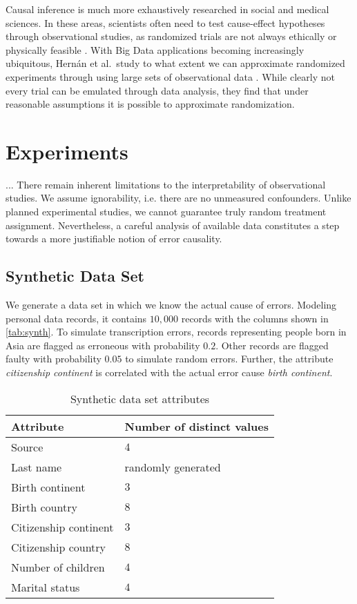 \documentclass[acmsmall, nonacm, screen]{acmart} %
\begin{document}
Causal inference is much more exhaustively researched in social and medical sciences. In these areas, scientists often need to test cause-effect hypotheses through observational studies, as randomized trials are not always ethically or physically feasible \cite{Rosenbaum02}.
With Big Data applications becoming increasingly ubiquitous, Hern\'{a}n et al.\ study to what extent we can approximate randomized experiments through using large sets of observational data \cite{Robins16}.
While clearly not every trial can be emulated through data analysis, they find that under reasonable assumptions it is possible to approximate randomization.\\


\section{Experiments}
...
There remain inherent limitations to the interpretability of observational studies. We assume ignorability, i.e. there are no unmeasured confounders. 
Unlike planned experimental studies, we cannot guarantee truly random treatment assignment. Nevertheless, a careful analysis of available data constitutes a step towards a more justifiable notion of error causality.\\

\subsection{Synthetic Data Set}
We generate a data set in which we know the actual cause of errors. Modeling personal data records, it contains $10,000$ records with the columns shown in \autoref{tab:synth}. 
To simulate transcription errors, records representing people born in Asia are flagged as erroneous with probability $0.2$. Other records are flagged faulty with probability $0.05$ to simulate random errors.
Further, the attribute \textit{citizenship continent} is correlated with the actual error cause \textit{birth continent}.
\begin{table}[htbp]
\begin{center}
\begin{tabular}{ll}
\toprule 
Attribute & Number of distinct values \\ 
\midrule 
Source & $4$ \\ 
Last name  & randomly generated \\ 
Birth continent  & $3$ \\ 
Birth country  & $8$ \\ 
Citizenship continent  & $3$ \\ 
Citizenship country  & $8$ \\ 
Number of children & $4$ \\ 
Marital status & $4$ \\ 
\bottomrule 
\end{tabular} 
\caption{Synthetic data set attributes}
\label{tab:synth}
\end{center}
\end{table}
\end{document}
